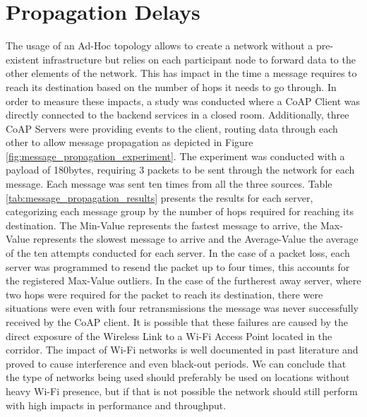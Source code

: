 \section{Propagation Delays}
The usage of an Ad-Hoc topology allows to create a network without a pre-existent infrastructure but relies on each participant node to forward data to the other elements of the network. This has impact in the time a message requires to reach its destination based on the number of hops it needs to go through. In order to measure these impacts, a study was conducted where a \gls{CoAP} Client was directly connected to the backend services in a closed room. Additionally, three \gls{CoAP} Servers were providing events to the client, routing data through each other to allow message propagation as depicted in Figure \ref{fig:message_propagation_experiment}. The experiment was conducted with a payload of 180bytes, requiring 3 packets to be sent through the network for each message. Each message was sent ten times from all the three sources. Table \ref{tab:message_propagation_results} presents the results for each server, categorizing each message group by the number of hops required for reaching its destination. The Min-Value represents the fastest message to arrive, the Max-Value represents the slowest message to arrive and the Average-Value the average of the ten attempts conducted for each server. In the case of a packet loss, each server was programmed to resend the packet up to four times, this accounts for the registered Max-Value outliers. In the case of the furtherest away server, where two hops were required for the packet to reach its destination, there were situations were even with four retransmissions the message was never successfully received by the \gls{CoAP} client. It is possible that these failures are caused by the direct exposure of the Wireless Link to a Wi-Fi Access Point located in the corridor. The impact of Wi-Fi networks is well documented in past literature \cite{Dong} and proved to cause interference and even black-out periods. We can conclude that the type of networks being used should preferably be used on locations without heavy Wi-Fi presence, but if that is not possible the network should still perform with high impacts in performance and throughput. 

